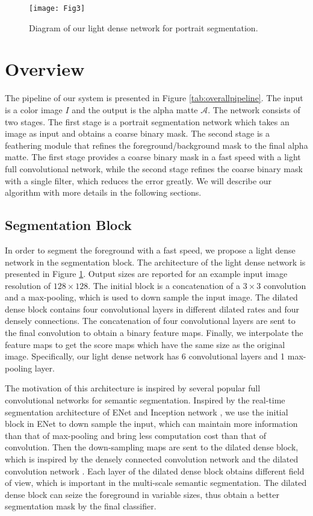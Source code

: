 \documentclass[sigconf]{acmart}
\begin{document}
\begin{figure}
\texttt{[image: Fig3]}
\caption{Diagram of our light dense network for portrait segmentation.}
\label{tab:LDN}
\end{figure}\section{Overview}
The pipeline of our system is presented in Figure \ref{tab:overallpipeline}. The input is a color image $I$ and the output is the alpha matte $\mathscr{A}$. The network consists of two stages. The first stage is a portrait segmentation network which takes an image as input and obtains a coarse binary mask. The second stage is a feathering module that refines the foreground/background mask to the final alpha matte. The first stage provides a coarse binary mask in a fast speed with a light full convolutional network, while the second stage refines the coarse binary mask with a single filter, which reduces the error greatly. We will describe our algorithm with more details in the following sections.
\subsection{Segmentation Block}
In order to segment the foreground with a fast speed, we propose a light dense network in the segmentation block. The architecture of the light dense network is presented in Figure \ref{tab:LDN}. Output sizes are reported for an example input image resolution of $128 \times 128$. The initial block is a concatenation of a $3 \times 3$ convolution and a max-pooling, which is used to down sample the input image. The dilated dense block contains four convolutional layers in different dilated rates and four densely connections. The concatenation of four convolutional layers are sent to the final convolution to obtain a binary feature maps. Finally, we interpolate the feature maps to get the score maps which have the same size as the original image. Specifically, our light dense network has 6 convolutional layers and 1 max-pooling layer.

The motivation of this architecture is inspired by several popular full convolutional networks for semantic segmentation. Inspired by the real-time segmentation architecture of ENet \cite{paszke2016enet} and Inception network \cite{szegedy2016inception}, we use the initial block in ENet to down sample the input, which can maintain more information than that of max-pooling and bring less computation cost than that of convolution. Then the down-sampling maps are sent to the dilated dense block, which is inspired by the densely connected convolution network \cite{huang2016densely} and the dilated convolution network \cite{chen2014semantic}. Each layer of the dilated dense block obtains different field of view, which is important in the multi-scale semantic segmentation. The dilated dense block can seize the foreground in variable sizes, thus obtain a better segmentation mask by the final classifier.
\end{document}
